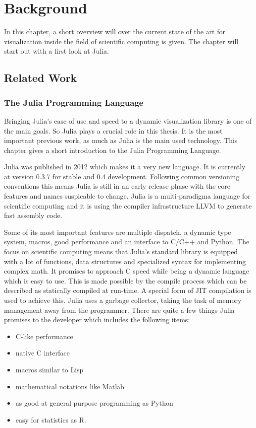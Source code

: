 \section{Background}

In this chapter, a short overview will over the current state of the art for visualization inside the field of scientific computing is given. The chapter will start out with a first look at Julia.

\subsection{Related Work}

\subsubsection{The Julia Programming Language}

Bringing Julia's ease of use and speed to a dynamic visualization library is one of the main goals.
So Julia plays a crucial role in this thesis. 
It is the most important previous work, as much as Julia is the main used technology.
This chapter gives a short introduction to the Julia Programming Language.

Julia was published in 2012 which makes it a very new language. It is currently at version 0.3.7 for stable and 0.4 development.
Following common versioning conventions this means Julia is still in an early release phase with the core features and names suspicable to change.
Julia is a multi-paradigma language for scientific computing and it is using the compiler infrastructure \ac{LLVM} to generate fast assembly code.

Some of its most important features are multiple dispatch, a dynamic type system, macros, good performance and an interface to C/C++ and Python.
The focus on scientific computing means that Julia's standard library is equipped with a lot of functions, data structures and specialized syntax for implementing complex math.
It promises to approach C speed while being a dynamic language which is easy to use.
This is made possible by the compile process which can be described as statically compiled at run-time. A special form of \ac{JIT} compilation is used to achieve this.
Julia uses a garbage collector, taking the task of memory management away from the programmer.
There are quite a few things Julia promises to the developer which includes the following items\cite{WhyJulia}:

\begin{itemize}
	\item C-like performance
	\item native C interface
	\item macros similar to Lisp
	\item mathematical notations like Matlab
	\item as good at general purpose programming as Python
	\item easy for statistics as R.
\end{itemize}

